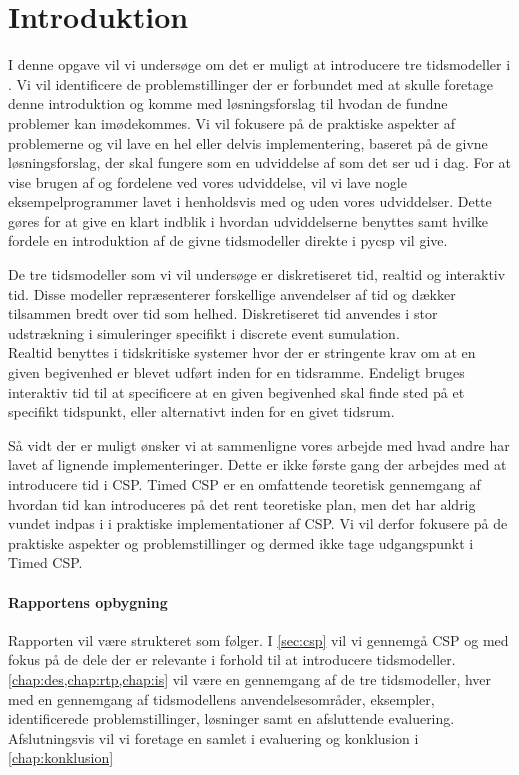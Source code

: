 \chapter{Introduktion}
I denne opgave vil vi undersøge om det er muligt at introducere tre tidsmodeller i \pycsp. Vi vil identificere de problemstillinger der er forbundet med at skulle foretage denne introduktion og komme med løsningsforslag til hvodan de fundne problemer kan imødekommes. Vi vil fokusere på de praktiske aspekter af problemerne og vil lave en  hel eller delvis implementering, baseret på de givne løsningsforslag, der skal fungere som en udviddelse af \pycsp som det ser ud i dag. For at vise brugen af og fordelene ved vores udviddelse, vil vi lave nogle eksempelprogrammer lavet i \pycsp henholdsvis med og uden vores udviddelser. Dette gøres for at give en klart indblik i hvordan udviddelserne benyttes samt hvilke fordele en introduktion af de givne tidsmodeller direkte i pycsp vil give. 

De tre tidsmodeller som vi vil undersøge er diskretiseret tid, realtid og interaktiv tid. Disse modeller repræsenterer forskellige anvendelser af tid og dækker tilsammen bredt over tid som helhed. Diskretiseret tid anvendes i stor udstrækning i simuleringer specifikt i discrete event sumulation. \\
Realtid benyttes i tidskritiske systemer hvor der er stringente krav om at en given begivenhed er blevet udført inden for en tidsramme. Endeligt bruges interaktiv tid til at specificere at en given begivenhed skal finde sted på et specifikt tidspunkt, eller alternativt inden for en givet tidsrum. 

Så vidt der er muligt ønsker vi at sammenligne vores arbejde med hvad andre har lavet af lignende implementeringer. Dette er ikke første gang der arbejdes med at introducere tid i CSP. Timed CSP er en omfattende teoretisk gennemgang af hvordan tid kan introduceres på det rent teoretiske plan, men det har aldrig vundet indpas i i praktiske implementationer af CSP. Vi vil derfor fokusere på de praktiske aspekter og problemstillinger og dermed ikke tage udgangspunkt i Timed CSP. 

\subsubsection{Rapportens opbygning}
Rapporten vil være strukteret som følger. I \cref{sec:csp} vil vi gennemgå CSP og \pycsp med fokus på de dele der er relevante i forhold til at introducere tidsmodeller. \cref{chap:des,chap:rtp,chap:is} vil være en gennemgang af de tre tidsmodeller, hver med en gennemgang af tidsmodellens anvendelsesområder, eksempler, identificerede problemstillinger, løsninger samt en afsluttende evaluering. Afslutningsvis vil vi foretage en samlet i evaluering og konklusion i \cref{chap:konklusion}




